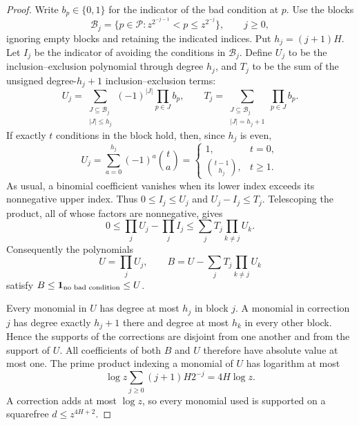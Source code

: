 \begin{proof}
Write $b_p\in\{0,1\}$ for the indicator of the bad condition at $p$.
Use the blocks
\[
 \mathcal B_j=\{p\in\mathcal P:
        z^{2^{-j-1}}<p\le z^{2^{-j}}\},\qquad j\ge0,
\]
ignoring empty blocks and retaining the indicated indices.
Put $h_j=(j+1)H$. Let $I_j$ be the indicator of avoiding the
conditions in $\mathcal B_j$. Define $U_j$ to be the
inclusion--exclusion polynomial through degree $h_j$, and $T_j$ to
be the sum of the unsigned degree-$h_j+1$ inclusion--exclusion terms:
\[
 U_j=\sum_{\substack{J\subseteq\mathcal B_j\\|J|\le h_j}}
             (-1)^{|J|}\prod_{p\in J}b_p,
 \qquad
 T_j=\sum_{\substack{J\subseteq\mathcal B_j\\|J|=h_j+1}}
             \prod_{p\in J}b_p.
\]
If exactly $t$ conditions in the block hold, then, since $h_j$ is even,
\[
 U_j=\sum_{a=0}^{h_j}(-1)^a\binom ta
 =\begin{cases}1,&t=0,\\ \binom{t-1}{h_j},&t\ge1.
 \end{cases}
\]
As usual, a binomial coefficient vanishes when its lower index
exceeds its nonnegative upper index. Thus
$0\le I_j\le U_j$ and $U_j-I_j\le T_j$.
Telescoping the product, all of whose factors are nonnegative, gives
\[
 0\le\prod_jU_j-\prod_jI_j
       \le\sum_jT_j\prod_{k\ne j}U_k.
\]
Consequently the polynomials
\begin{equation}\label{eq:block-polynomials}
 U=\prod_jU_j,
 \qquad
 B=U-\sum_jT_j\prod_{k\ne j}U_k
\end{equation}
satisfy $B\le\mathbf{1}_{\text{no bad condition}}\le U$.

Every monomial in $U$ has degree at most $h_j$ in block $j$.
A monomial in correction $j$ has degree exactly $h_j+1$ there
and degree at most $h_k$ in every other block. Hence the supports
of the corrections are disjoint from one another and from the
support of $U$. All coefficients of both $B$ and $U$ therefore
have absolute value at most one. The prime product indexing a
monomial of $U$ has logarithm at most
\[
 \log z\sum_{j\ge0}(j+1)H2^{-j}=4H\log z.
\]
A correction adds at most $\log z$, so every monomial used is
supported on a squarefree $d\le z^{4H+2}$.


\end{proof}

